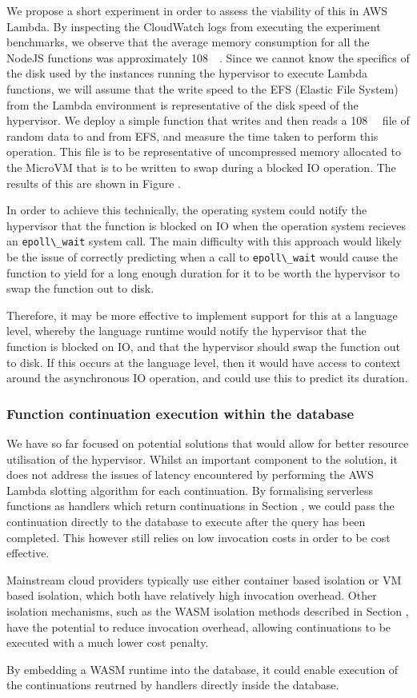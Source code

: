 We propose a short experiment in order to assess the viability of this in AWS Lambda. By inspecting the CloudWatch logs from executing the experiment benchmarks, we observe that the average memory consumption for all the NodeJS functions was approximately \SI{108}{\mega\byte}. Since we cannot know the specifics of the disk used by the instances running the hypervisor to execute Lambda functions, we will assume that the write speed to the EFS (Elastic File System) from the Lambda environment is representative of the disk speed of the hypervisor. We deploy a simple function that writes and then reads a \SI{108}{\mega\byte} file of random data to and from EFS, and measure the time taken to perform this operation. This file is to be representative of uncompressed memory allocated to the MicroVM that is to be written to swap during a blocked IO operation. The results of this are shown in Figure .

In order to achieve this technically, the operating system could notify the hypervisor that the function is blocked on IO when the operation system recieves an \verb|epoll\_wait| system call. The main difficulty with this approach would likely be the issue of correctly predicting when a call to \verb|epoll\_wait| would cause the function to yield for a long enough duration for it to be worth the hypervisor to swap the function out to disk.

Therefore, it may be more effective to implement support for this at a language level, whereby the language runtime would notify the hypervisor that the function is blocked on IO, and that the hypervisor should swap the function out to disk. If this occurs at the language level, then it would have access to context around the asynchronous IO operation, and could use this to predict its duration.

\subsubsection{Function continuation execution within the database}
We have so far focused on potential solutions that would allow for better resource utilisation of the hypervisor. Whilst an important component to the solution, it does not address the issues of latency encountered by performing the AWS Lambda slotting algorithm for each continuation. By formalising serverless functions as handlers which return continuations in Section , we could pass the continuation directly to the database to execute after the query has been completed. This however still relies on low invocation costs in order to be cost effective.

Mainstream cloud providers typically use either container based isolation or VM based isolation, which both have relatively high invocation overhead. Other isolation mechanisms, such as the WASM isolation methods described in Section , have the potential to reduce invocation overhead, allowing continuations to be executed with a much lower cost penalty.

By embedding a WASM runtime into the database, it could enable execution of the continuations reutrned by \faaasc{} handlers directly inside the database.
